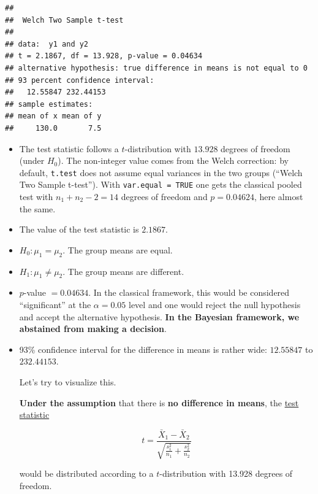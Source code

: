 \documentclass[
]{book}
\begin{document}
\begin{verbatim}
## 
##  Welch Two Sample t-test
## 
## data:  y1 and y2
## t = 2.1867, df = 13.928, p-value = 0.04634
## alternative hypothesis: true difference in means is not equal to 0
## 93 percent confidence interval:
##   12.55847 232.44153
## sample estimates:
## mean of x mean of y 
##     130.0       7.5
\end{verbatim}

\begin{itemize}
\item
  The test statistic follows a \(t\)-distribution with \(13.928\) degrees of freedom (under \(H_0\)).
  The non-integer value comes from the Welch correction: by default, \texttt{t.test} does not assume equal variances
  in the two groups (``Welch Two Sample t-test''). With \texttt{var.equal\ =\ TRUE} one gets the classical pooled test
  with \(n_1 + n_2 - 2 = 14\) degrees of freedom and \(p = 0.04624\), here almost the same.
\item
  The value of the test statistic is \(2.1867\).
\item
  \(H_0: \mu_1 = \mu_2\). The group means are equal.
\item
  \(H_1: \mu_1 \ne \mu_2\). The group means are different.
\item
  \(p\)-value \(= 0.04634\). In the classical framework,
  this would be considered ``significant'' at the \(\alpha = 0.05\) level
  and one would reject the null hypothesis and accept the alternative hypothesis.
  \textbf{In the Bayesian framework, we abstained from making a decision}.
\item
  93\% confidence interval for the difference in means is rather wide:
  \(12.55847\) to \(232.44153\).

  Let's try to visualize this.

  \textbf{Under the assumption} that there is \textbf{no difference in means},
  the \href{https://en.wikipedia.org/wiki/Student\%27s_t-test\#Equal_or_unequal_sample_sizes,_unequal_variances_(sX1_\%3E_2sX2_or_sX2_\%3E_2sX1)}{test statistic}

  \[ t = \frac{\bar{X}_1 - \bar{X}_2}{\sqrt{\frac{s_1^2}{n_1} + \frac{s_2^2}{n_2}}} \]

  would be distributed according to a \(t\)-distribution with 13.928 degrees of freedom.
\end{itemize}
\end{document}
